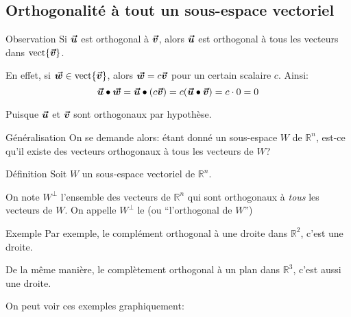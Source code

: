 \documentclass[a4paper]{article}
\begin{document}
\subsection{Orthogonalité à tout un sous-espace vectoriel}


\begin{parag}{Observation}
    Si $\bm{\protect\vec{u}}$ est orthogonal à $\bm{\protect\vec{v}}$, alors $\bm{\protect\vec{u}}$ est orthogonal à tous les vecteurs dans $\vect\left\{\bvec{v}\right\}$.

    En effet, si $\bvec{w} \in \vect\left\{\bvec{v}\right\}$, alors $\bm{\protect\vec{w}} = c \bm{\protect\vec{v}}$ pour un certain scalaire $c$. Ainsi: 
    \[\bvec{u} \dotprod \bvec{w} = \bvec{u} \dotprod \left(c \bvec{v}\right) = c\left(\bvec{u} \dotprod \bvec{v}\right) = c\cdot 0 = 0\]
    
    Puisque $\bm{\protect\vec{u}}$ et $\bm{\protect\vec{v}}$ sont orthogonaux par hypothèse.

    \begin{subparag}{Généralisation}
        On se demande alors: étant donné un sous-espace $W$ de $\mathbb{R}^n$, est-ce qu'il existe des vecteurs orthogonaux à tous les vecteurs de $W$?
    \end{subparag}
    
\end{parag}

\begin{parag}{Définition}
    Soit $W$ un sous-espace vectoriel de $\mathbb{R}^{n}$.

    On note $W^{\perp}$ l'ensemble des vecteurs de $\mathbb{R}^{n}$ qui sont orthogonaux à \textit{tous} les vecteurs de $W$. On appelle $W^{\perp}$ le  (ou ``l'orthogonal de $W$'')
\end{parag}

\begin{parag}{Exemple}
    Par exemple, le complément orthogonal à une droite dans $\mathbb{R}^2$, c'est une droite.

    De la même manière, le complètement orthogonal à un plan dans $\mathbb{R}^3$, c'est aussi une droite.

    On peut voir ces exemples graphiquement:
\end{parag}
\end{document}
